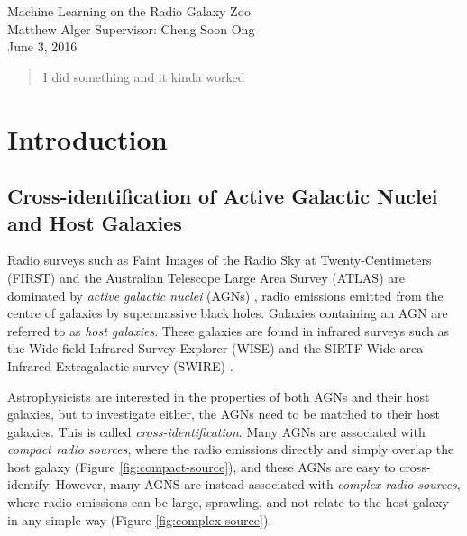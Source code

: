 \documentclass[a4paper]{article}
\newcommand{\fig}{Figure }
\begin{document}
  {\Large\noindent  Machine Learning on the Radio Galaxy Zoo}\\

  {\large\noindent  Matthew Alger \hfill Supervisor: Cheng Soon Ong}\\

  {\large\noindent  June 3, 2016}\\

  \begin{abstract}
    I did something and it kinda worked
  \end{abstract}

  \section{Introduction}

    \subsection{Cross-identification of Active Galactic Nuclei and Host Galaxies}

      Radio surveys such as Faint Images of the Radio Sky at Twenty-Centimeters (FIRST) \cite{white97,becker95} and the Australian Telescope Large Area Survey (ATLAS) \cite{franzen15} are dominated by \emph{active galactic nuclei} (AGNs) \cite{banfield15}, radio emissions emitted from the centre of galaxies by supermassive black holes\cite{peterson97}. Galaxies containing an AGN are referred to as \emph{host galaxies}. These galaxies are found in infrared surveys such as the Wide-field Infrared Survey Explorer (WISE) \cite{wright10} and the SIRTF Wide-area Infrared Extragalactic survey (SWIRE) \cite{surace05,lonsdale03}.

      Astrophysicists are interested in the properties of both AGNs and their host galaxies, but to investigate either, the AGNs need to be matched to their host galaxies. This is called \emph{cross-identification}. Many AGNs are associated with \emph{compact radio sources}, where the radio emissions directly and simply overlap the host galaxy (\fig \ref{fig:compact-source}), and these AGNs are easy to cross-identify\cite{banfield15}. However, many AGNS are instead associated with \emph{complex radio sources}, where radio emissions can be large, sprawling, and not relate to the host galaxy in any simple way (\fig \ref{fig:complex-source}).
\end{document}
